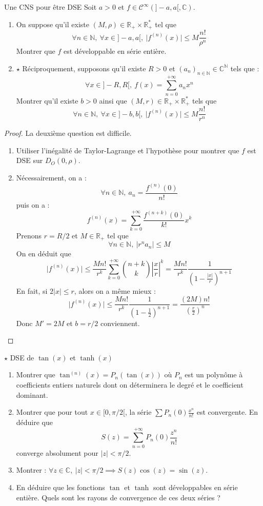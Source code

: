\documentclass[french,a4paper]{article}
\newcommand{\N}{\mathbb{N}}
\newcommand{\R}{\mathbb{R}}
\newcommand{\C}{\mathbb{C}}
\newcommand{\st}{^*}
\theoremstyle{plain}
\theoremstyle{definition}
\theoremstyle{remark}
\begin{document}
\begin{ex}[Moulin.SE.42]{Une CNS pour être DSE}
	Soit $a>0$ et $f\in\mathcal{C}^\infty(]-a,a[,\C)$. 
	\begin{enumerate}
		\item On suppose qu'il existe $(M,\rho)\in\R_+\times\R_+\st$ tel que $$\forall n\in\N,\ \forall x\in]-a,a[,\ \lvert f^{(n)}(x)\rvert\leqslant M\frac{n!}{\rho^n}$$ Montrer que $f$ est développable en série entière.
		\item $\star$ Réciproquement, supposons qu'il existe $R>0$ et $(a_n)_{n\in\N}\in\C^\N$ tels que : $$\forall x\in]-R,R[,\ f(x)=\sum_{n=0}^{+\infty}a_nx^n$$ Montrer qu'il existe $b>0$ ainsi que $(M,r)\in\R_+\times\R_+\st$ tels que $$\forall n\in\N,\ \forall x\in]-b,b[,\ \lvert f^{(n)}(x)\rvert\leqslant M\frac{n!}{r^n}$$
	\end{enumerate}
\end{ex}
\begin{proof}
	La deuxième question est difficile.
	\begin{enumerate}
		\item Utiliser l'inégalité de Taylor-Lagrange et l'hypothèse pour montrer que $f$ est DSE sur $D_O(0,\rho)$.
		\item Nécessairement, on a : $$\forall n\in\N,\ a_n=\frac{f^{(n)}(0)}{n!}$$ puis on a : $$f^{(n)}(x)=\sum_{k=0}^{+\infty}\frac{f^{(n+k)}(0)}{k!}x^k$$ Prenons $r=R/2$ et $M\in\R_+$ tel que $$\forall n\in\N,\ \lvert r^na_n\rvert\leqslant M$$ On en déduit que $$\lvert f^{(n)}(x)\rvert\leqslant\frac{Mn!}{r^k}\sum_{k=0}^{+\infty}\binom{n+k}{k}\left\lvert\frac{x}{r}\right\rvert^k=\frac{Mn!}{r^k}\frac{1}{\left(1-\frac{\lvert x\rvert}{r}\right)^{n+1}}$$ En fait, si $2\lvert x\rvert\leqslant r$, alors on a même mieux : $$\lvert f^{(n)}(x)\rvert\leqslant\frac{Mn!}{r^k}\frac{1}{\left(1-\frac{1}{2}\right)^{n+1}}=\frac{(2M)n!}{\left(\frac{r}{2}\right)^n}$$ Donc $M'=2M$ et $b=r/2$ conviennent.
	\end{enumerate}
\end{proof}

\begin{ex}[Moulin.SE.43]{$\star$ DSE de $\tan(x)$ et $\tanh(x)$}
	\begin{enumerate}
		\item Montrer que $\tan^{(n)}(x)=P_n(\tan(x))$ où $P_n$ est un polynôme à coefficients entiers naturels dont on déterminera le degré et le coefficient dominant.
		\item Montrer que pour tout $x\in[0,\pi/2[$, la série $\displaystyle\sum P_n(0)\frac{x^n}{n!}$ est convergente. En déduire que $$S(z)=\sum_{n=0}^{+\infty}P_n(0)\frac{z^n}{n!}$$ converge absolument pour $\lvert z\rvert<\pi/2$.
		\item Montrer : $\forall z\in\C,\ \lvert z\rvert<\pi/2\implies S(z)\cos(z)=\sin(z)$.
		\item En déduire que les fonctions $\tan$ et $\tanh$ sont développables en série entière. Quels sont les rayons de convergence de ces deux séries ?
	\end{enumerate}
\end{ex}
\end{document}

